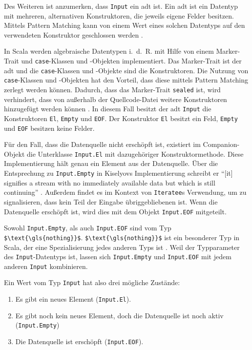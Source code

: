 Des Weiteren ist anzumerken, dass \lstinline|Input| ein \gls{adt} ist.
Ein \gls{adt} ist ein Datentyp mit mehreren, alternativen Konstruktoren, die jeweils eigene Felder besitzen.
Mittels Pattern Matching kann von einem Wert eines solchen Datentyps auf den verwendeten Konstruktor geschlossen werden \cite[vgl.][S.~14--15]{algebraic_data_type}.

In Scala werden algebraische Datentypen i.~d.~R. mit Hilfe von einem Marker-Trait und \lstinline|case|-Klassen und -Objekten implementiert.
Das Marker-Trait ist der \gls{adt} und die \lstinline|case|-Klassen und -Objekte sind die Konstruktoren.
Die Nutzung von \lstinline|case|-Klassen und -Objekten hat den Vorteil, dass diese mittels Pattern Matching zerlegt werden können.
Dadurch, dass das Marker-Trait \lstinline|sealed| ist, wird verhindert, dass von außerhalb der Quellcode-Datei weitere Konstruktoren hinzugefügt werden können \cite[vgl.][]{algebraic_data_type_scala}.
In diesem Fall besitzt der \gls{adt} \lstinline|Input| die Konstruktoren \lstinline|El|, \lstinline|Empty| und \lstinline|EOF|.
Der Konstruktor \lstinline|El| besitzt ein Feld, \lstinline|Empty| und \lstinline|EOF| besitzen keine Felder.

Für den Fall, dass die Datenquelle nicht erschöpft ist, existiert im Companion-Objekt die Unterklasse \lstinline|Input.El| mit dazugehöriger Konstruktormethode.
Diese Implementierung hält genau ein Element aus der Datenquelle.
Über die Entsprechung zu \lstinline|Input.Empty| in Kiselyovs Implementierung schreibt er "`[it] signifies a stream with no immediately available data but which is still continuing"' \cite[vgl.][]{iteratee_io}.
Außerdem findet es im Kontext von \lstinline|Iteratee|s Verwendung, um zu signalisieren, dass kein Teil der Eingabe übriggebliebenen ist.
Wenn die Datenquelle erschöpft ist, wird dies mit dem Objekt \lstinline|Input.EOF| mitgeteilt.

Sowohl \lstinline|Input.Empty|, als auch \lstinline|Input.EOF| sind vom Typ \lstinline[mathescape]|$\text{\gls{nothing}}$|.
\lstinline[mathescape]|$\text{\gls{nothing}}$| ist ein besonderer Typ in Scala, der eine Spezialisierung jedes anderen Typs ist \cite[vgl.][S.~32]{scala_specification}.
Weil der Typparameter des \lstinline|Input|-Datentyps  ist, lassen sich \lstinline|Input.Empty| und \lstinline|Input.EOF| mit jedem anderen \lstinline|Input| kombinieren.

Ein Wert vom Typ \lstinline|Input| hat also drei mögliche Zustände:
\begin{enumerate}
  \item Es gibt ein neues Element (\lstinline|Input.El|).
  \item Es gibt noch kein neues Element, doch die Datenquelle ist noch aktiv (\lstinline|Input.Empty|)
  \item Die Datenquelle ist erschöpft (\lstinline|Input.EOF|).
\end{enumerate}

